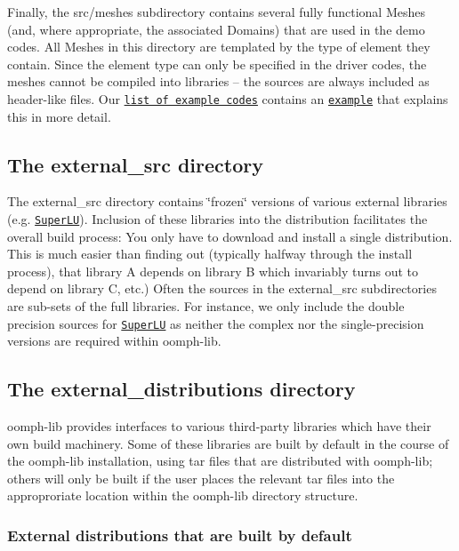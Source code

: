 Finally, the {\ttfamily src/meshes} subdirectory contains several fully functional {\ttfamily Meshes} (and, where appropriate, the associated {\ttfamily Domains}) that are used in the demo codes. All {\ttfamily Meshes} in this directory are templated by the type of element they contain. Since the element type can only be specified in the driver codes, the meshes cannot be compiled into libraries -- the sources are always included as header-\/like files. Our \href{../../example_code_list/html/index.html}{\tt list of example codes} contains an \href{../../poisson/two_d_poisson/html/index.html#precompile_mesh}{\tt example} that explains this in more detail.\hypertarget{index_ext_src}{}\subsection{The external\+\_\+src directory}\label{index_ext_src}
The {\ttfamily external\+\_\+src} directory contains \char`\"{}frozen\char`\"{} versions of various external libraries (e.\+g. \href{http://crd.lbl.gov/~xiaoye/SuperLU}{\tt Super\+LU}). Inclusion of these libraries into the distribution facilitates the overall build process\+: You only have to download and install a single distribution. This is much easier than finding out (typically halfway through the install process), that library A depends on library B which invariably turns out to depend on library C, etc.) Often the sources in the {\ttfamily external\+\_\+src} subdirectories are sub-\/sets of the full libraries. For instance, we only include the double precision sources for \href{http://crd.lbl.gov/~xiaoye/SuperLU}{\tt Super\+LU} as neither the complex nor the single-\/precision versions are required within {\ttfamily oomph-\/lib}.\hypertarget{index_ext_dist}{}\subsection{The external\+\_\+distributions directory}\label{index_ext_dist}
{\ttfamily oomph-\/lib} provides interfaces to various third-\/party libraries which have their own build machinery. Some of these libraries are built by default in the course of the oomph-\/lib installation, using tar files that are distributed with {\ttfamily oomph-\/lib}; others will only be built if the user places the relevant tar files into the approproriate location within the {\ttfamily oomph-\/lib} directory structure.\hypertarget{index_cgal}{}\subsubsection{External distributions that are built by default}\label{index_cgal}
